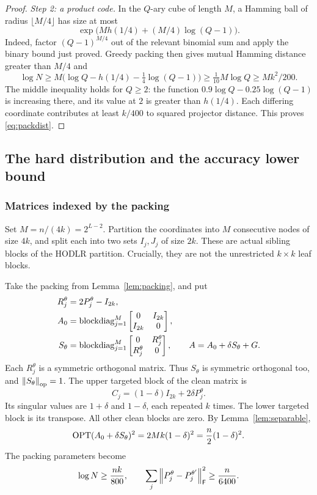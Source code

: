 \begin{proof}
\emph{Step 2: a product code.}
In the $Q$-ary cube of length $M$, a Hamming ball of radius $\lfloor M/4\rfloor$
has size at most
\[
 \exp\bigl(Mh(1/4)+(M/4)\log(Q-1)\bigr).
\]
Indeed, factor $(Q-1)^{M/4}$ out of the relevant binomial sum and apply the
binary bound just proved. Greedy packing then gives mutual Hamming distance
greater than $M/4$ and
\[
 \log N\ge M\bigl(\log Q-h(1/4)-\tfrac14\log(Q-1)\bigr)
 \ge\tfrac1{10}M\log Q\ge Mk^2/200.
\]
The middle inequality holds for $Q\ge2$: the function
$0.9\log Q-0.25\log(Q-1)$ is increasing there, and its value at $2$ is greater
than $h(1/4)$. Each differing coordinate contributes at least $k/400$ to
squared projector distance. This proves \eqref{eq:packdist}.
\end{proof}

\subsection{The hard distribution and the accuracy lower bound}

\subsubsection{Matrices indexed by the packing}

Set $M=n/(4k)=2^{L-2}$. Partition the coordinates into $M$ consecutive nodes
of size $4k$, and split each into two sets $I_j,J_j$ of size $2k$.
These are actual sibling blocks of the HODLR partition. Crucially, they are
not the unrestricted $k\times k$ leaf blocks.

Take the packing from Lemma~\ref{lem:packing}, and put
\begin{align}\label{eq:hardfamily}
 R_j^\theta&=2P_j^\theta-I_{2k},\notag\\
 A_0&=\operatorname{blockdiag}_{j=1}^M
       \begin{bmatrix}0&I_{2k}\\ I_{2k}&0\end{bmatrix},\notag\\
 S_\theta&=\operatorname{blockdiag}_{j=1}^M
       \begin{bmatrix}0&R_j^\theta\\ R_j^\theta&0\end{bmatrix},\qquad
 A=A_0+\delta S_\theta+G.
\end{align}
Each $R_j^\theta$ is a symmetric orthogonal matrix. Thus $S_\theta$ is symmetric
orthogonal too, and $\left\lVert S_\theta\right\rVert_{\mathrm{op}}=1$.
The upper targeted block of the clean matrix is
\[
 C_j=(1-\delta)I_{2k}+2\delta P_j^\theta.
\]
Its singular values are $1+\delta$ and $1-\delta$, each repeated $k$ times.
The lower targeted block is its transpose. All other clean blocks are zero.
By Lemma~\ref{lem:separable},
\begin{equation}\label{eq:cleanopt}
 \operatorname{OPT}(A_0+\delta S_\theta)^2
 =2Mk(1-\delta)^2=\frac n2(1-\delta)^2.
\end{equation}
The packing parameters become
\begin{equation}\label{eq:packingn}
 \log N\ge\frac{nk}{800},\qquad
 \sum_j\left\lVert P_j^\theta-P_j^{\theta'}\right\rVert_{\mathsf F}^2\ge\frac n{6400}.
\end{equation}

